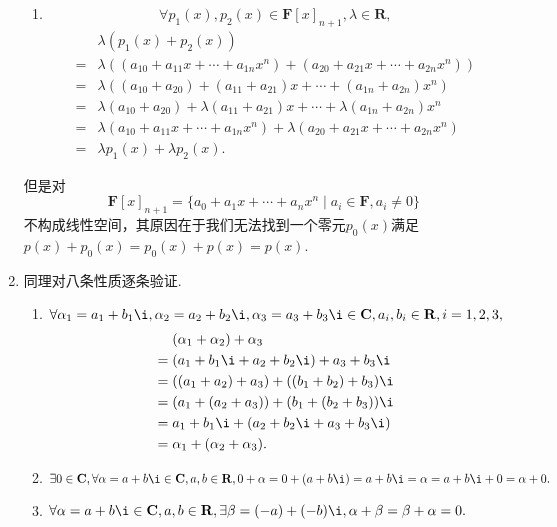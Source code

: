 \begin{solution}
\begin{enumerate}
\begin{enumerate}
                    \item \[\forall p_1(x), p_2(x) \in \mathbf{F}[x]_{n+1}, \lambda \in \mathbf{R},\]
                    \begin{align*}
                        & \lambda(p_1(x) + p_2(x)) \\ ={} & \lambda((a_{10} + a_{11}x + \cdots + a_{1n}x^n) + (a_{20} + a_{21}x + \cdots + a_{2n}x^n)) \\ ={} & \lambda((a_{10} + a_{20}) + (a_{11} + a_{21})x + \cdots + (a_{1n} + a_{2n})x^n) \\ ={} & \lambda(a_{10} + a_{20}) + \lambda(a_{11} + a_{21})x + \cdots + \lambda(a_{1n} + a_{2n})x^n \\ ={} & \lambda(a_{10} + a_{11}x + \cdots + a_{1n}x^n) + \lambda(a_{20} + a_{21}x + \cdots + a_{2n}x^n) \\ ={} & \lambda p_1(x) + \lambda p_2(x).
                    \end{align*}
                \end{enumerate}
            但是对\[\mathbf{F}[x]_{n+1}=\{a_0+a_1x+\cdots+a_nx^n \mid a_i\in\mathbf{F},a_i\neq 0\}\]不构成线性空间，其原因在于我们无法找到一个零元$p_0(x)$满足$p(x) + p_0(x) = p_0(x) + p(x) = p(x)$.
        \item 同理对八条性质逐条验证.
                \begin{enumerate}
                    \item $\forall \alpha_1 = a_1+b_1\i , \alpha_2 = a_2+b_2\i , \alpha_3 = a_3+b_3\i \in \mathbf{C},a_i, b_i \in \mathbf{R}, i = 1, 2, 3,$
                    \begin{align*}
                        & (\alpha_1+\alpha_2)+\alpha_3 \\ ={} & (a_1+b_1\i+a_2+b_2\i)+a_3+b_3\i \\ ={} & ((a_1+a_2)+a_3)+((b_1+b_2)+b_3)\i \\ ={} & (a_1+(a_2+a_3))+(b_1+(b_2+b_3))\i \\={} & a_1+b_1\i+(a_2+b_2\i+a_3+b_3\i) \\ ={} & \alpha_1+(\alpha_2+\alpha_3).
                    \end{align*}

                    \item $\exists 0 \in \mathbf{C}, \forall \alpha = a+b\i \in \mathbf{C}, a, b \in \mathbf{R}, 0+\alpha = 0+(a+b\i) = a+b\i = \alpha = a+b\i+0 = \alpha +0.$

                    \item $\forall \alpha = a+b\i \in \mathbf{C}, a, b \in \mathbf{R}, \exists \beta = (-a)+(-b)\i, \alpha +\beta = \beta + \alpha = 0.$


\end{enumerate}
\end{enumerate}
\end{solution}
